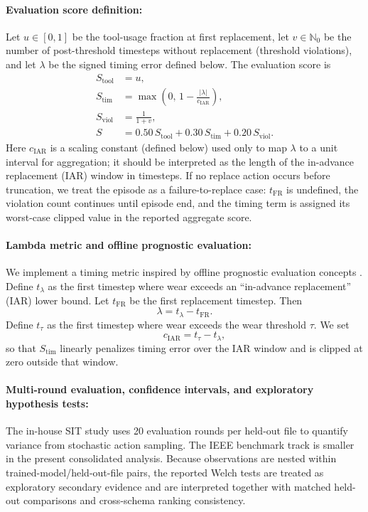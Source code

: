 \documentclass[sn-vancouver-num]{sn-jnl}%
\begin{document}
\paragraph{Evaluation score definition:}
Let $u\in[0,1]$ be the tool-usage fraction at first replacement, let $v\in\mathbb{N}_0$ be the number of post-threshold timesteps without replacement (threshold violations), and let $\lambda$ be the signed timing error defined below. The evaluation score is
\begin{align}
	S_{\text{tool}} &= u,\\
	S_{\text{tim}} &= \max\left(0,\,1-\frac{|\lambda|}{c_{\mathrm{IAR}}}\right),\\
	S_{\text{viol}} &= \frac{1}{1+v},\\
	S &= 0.50\,S_{\text{tool}} + 0.30\,S_{\text{tim}} + 0.20\,S_{\text{viol}}.
\end{align}
Here $c_{\mathrm{IAR}}$ is a scaling constant (defined below) used only to map $\lambda$ to a unit interval for aggregation; it should be interpreted as the length of the in-advance replacement (IAR) window in timesteps. If no replace action occurs before truncation, we treat the episode as a failure-to-replace case: $t_{\mathrm{FR}}$ is undefined, the violation count continues until episode end, and the timing term is assigned its worst-case clipped value in the reported aggregate score.

\paragraph{Lambda metric and offline prognostic evaluation:}
We implement a timing metric inspired by offline prognostic evaluation concepts \cite{Saxena2010Metrics}. Define $t_{\lambda}$ as the first timestep where wear exceeds an ``in-advance replacement'' (IAR) lower bound. Let $t_{\mathrm{FR}}$ be the first replacement timestep. Then
\begin{equation}
		\lambda = t_{\lambda} - t_{\mathrm{FR}}.
\end{equation}
Define $t_{\tau}$ as the first timestep where wear exceeds the wear threshold $\tau$. We set
\begin{equation}
\qquad c_{\mathrm{IAR}} = t_{\tau}-t_{\lambda},
\end{equation}
so that $S_{\text{tim}}$ linearly penalizes timing error over the IAR window and is clipped at zero outside that window.

\paragraph{Multi-round evaluation, confidence intervals, and exploratory hypothesis tests:}
The in-house SIT study uses 20 evaluation rounds per held-out file to quantify variance from stochastic action sampling. The IEEE benchmark track is smaller in the present consolidated analysis. Because observations are nested within trained-model/held-out-file pairs, the reported Welch tests are treated as exploratory secondary evidence and are interpreted together with matched held-out comparisons and cross-schema ranking consistency.
\end{document}
